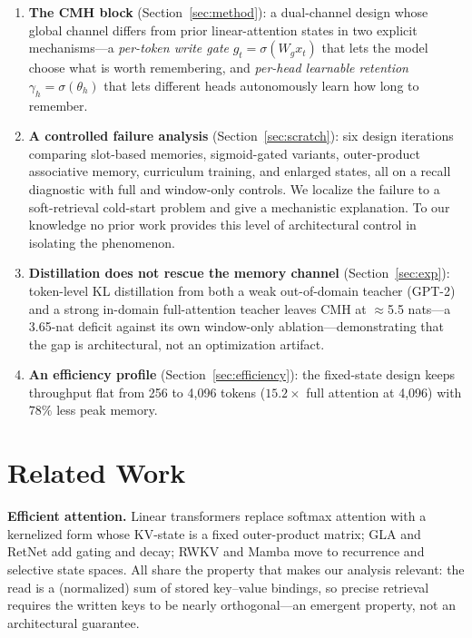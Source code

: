 \documentclass[11pt]{article}
\newcommand{\cmh}{CMH}
\begin{document}
\begin{enumerate}
\item \textbf{The \cmh{} block} (Section~\ref{sec:method}): a dual-channel design whose
global channel differs from prior linear-attention states in two explicit mechanisms---a
\emph{per-token write gate} $g_t=\sigma(W_g x_t)$ that lets the model choose what is worth
remembering, and \emph{per-head learnable retention} $\gamma_h=\sigma(\theta_h)$ that lets
different heads autonomously learn how long to remember.
\item \textbf{A controlled failure analysis} (Section~\ref{sec:scratch}): six design
iterations comparing slot-based memories, sigmoid-gated variants, outer-product associative
memory, curriculum training, and enlarged states, all on a recall diagnostic with full and
window-only controls. We localize the failure to a soft-retrieval cold-start problem and
give a mechanistic explanation. To our knowledge no prior work provides this level of
architectural control in isolating the phenomenon.
\item \textbf{Distillation does not rescue the memory channel} (Section~\ref{sec:exp}):
token-level KL distillation from both a weak out-of-domain teacher (GPT-2) and a strong
in-domain full-attention teacher leaves \cmh{} at $\approx$5.5 nats---a 3.65-nat deficit
against its own window-only ablation---demonstrating that the gap is architectural, not
an optimization artifact.
\item \textbf{An efficiency profile} (Section~\ref{sec:efficiency}): the fixed-state
design keeps throughput flat from 256 to 4,096 tokens ($15.2\times$ full attention at
4,096) with $78\%$ less peak memory.
\end{enumerate}

\section{Related Work}\label{sec:related}

\textbf{Efficient attention.} Linear transformers \cite{katharopoulos2020} replace softmax
attention with a kernelized form whose KV-state is a fixed outer-product matrix; GLA
\cite{yang2023gla} and RetNet \cite{sun2023retnet} add gating and decay; RWKV
\cite{peng2023rwkv} and Mamba \cite{gu2023mamba} move to recurrence and selective state
spaces. All share the property that makes our analysis relevant: the read is a
(normalized) sum of stored key--value bindings, so precise retrieval requires the written
keys to be nearly orthogonal---an emergent property, not an architectural guarantee.
\end{document}
